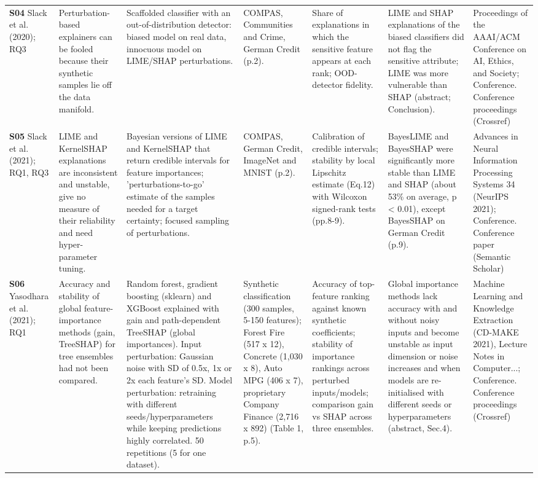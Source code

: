 \begin{longtable}{@{}P{1.55cm}P{2.9cm}P{4.5cm}P{3.2cm}P{3.4cm}P{4.6cm}P{3.6cm}@{}}
\textbf{S04} \cite{S04} Slack et al. (2020); RQ3 & Perturbation-based explainers can be fooled because their synthetic samples lie off the data manifold. & Scaffolded classifier with an out-of-distribution detector: biased model on real data, innocuous model on LIME/\allowbreak{}SHAP perturbations. & COMPAS, Communities and Crime, German Credit (p.2). & Share of explanations in which the sensitive feature appears at each rank; OOD-detector fidelity. & LIME and SHAP explanations of the biased classifiers did not flag the sensitive attribute; LIME was more vulnerable than SHAP (abstract; Conclusion). & Proceedings of the AAAI/\allowbreak{}ACM Conference on AI, Ethics, and Society; Conference. Conference proceedings (Crossref) \\
\textbf{S05} \cite{S05} Slack et al. (2021); RQ1, RQ3 & LIME and KernelSHAP explanations are inconsistent and unstable, give no measure of their reliability and need hyper-parameter tuning. & Bayesian versions of LIME and KernelSHAP that return credible intervals for feature importances; 'perturbations-to-go' estimate of the samples needed for a target certainty; focused sampling of perturbations. & COMPAS, German Credit, ImageNet and MNIST (p.2). & Calibration of credible intervals; stability by local Lipschitz estimate (Eq.12) with Wilcoxon signed-rank tests (pp.8-9). & BayesLIME and BayesSHAP were significantly more stable than LIME and SHAP (about 53\% on average, p \textless{} 0.01), except BayesSHAP on German Credit (p.9). & Advances in Neural Information Processing Systems 34 (NeurIPS 2021); Conference. Conference paper (Semantic Scholar) \\
\textbf{S06} \cite{S06} Yasodhara et al. (2021); RQ1 & Accuracy and stability of global feature-importance methods (gain, TreeSHAP) for tree ensembles had not been compared. & Random forest, gradient boosting (sklearn) and XGBoost explained with gain and path-dependent TreeSHAP (global importances). Input perturbation: Gaussian noise with SD of 0.5x, 1x or 2x each feature's SD. Model perturbation: retraining with different seeds/\allowbreak{}hyperparameters while keeping predictions highly correlated. 50 repetitions (5 for one dataset). & Synthetic classification (300 samples, 5-150 features); Forest Fire (517 x 12), Concrete (1,030 x 8), Auto MPG (406 x 7), proprietary Company Finance (2,716 x 892) (Table 1, p.5). & Accuracy of top-feature ranking against known synthetic coefficients; stability of importance rankings across perturbed inputs/\allowbreak{}models; comparison gain vs SHAP across three ensembles. & Global importance methods lack accuracy with and without noisy inputs and become unstable as input dimension or noise increases and when models are re-initialised with different seeds or hyperparameters (abstract, Sec.4). & Machine Learning and Knowledge Extraction (CD-MAKE 2021), Lecture Notes in Computer...; Conference. Conference proceedings (Crossref) \\

\end{longtable}
